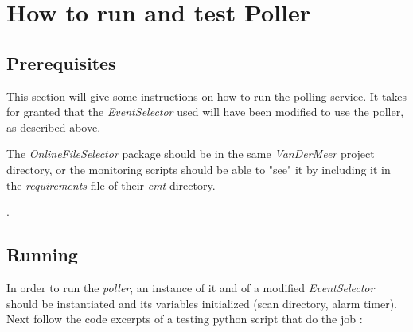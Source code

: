 \section{How to run and test Poller}\label{sec:HowTo}
\subsection{\textbf{Prerequisites}}
This section will give some instructions on how to run the polling service. It takes for granted that the \textit{EventSelector} used will have been modified to use the poller, as described above.\par
The \textit{OnlineFileSelector} package should be in the same \textit{VanDerMeer} project directory, or the monitoring scripts should be able to "see" it by including it in the \textit{requirements} file of their \textit{cmt} directory.\par.\subsection{\textbf{Running}}
In order to run the \textit{poller}, an instance of it and of a modified \textit{EventSelector} should be instantiated and its variables initialized (scan directory, alarm timer). Next follow the code excerpts of a testing python script that do the job : \par

